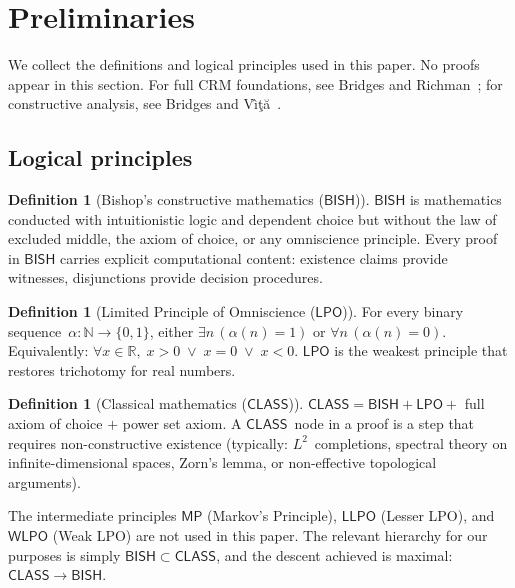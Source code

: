 \documentclass[11pt]{article}
\theoremstyle{plain}
\theoremstyle{definition}
\newtheorem{definition}[theorem]{Definition}
\theoremstyle{remark}
\newcommand{\N}{\mathbb{N}}
\newcommand{\R}{\mathbb{R}}
\newcommand{\BISH}{\mathsf{BISH}}
\newcommand{\LPO}{\mathsf{LPO}}
\newcommand{\WLPO}{\mathsf{WLPO}}
\newcommand{\LLPO}{\mathsf{LLPO}}
\newcommand{\MP}{\mathsf{MP}}
\newcommand{\CLASS}{\mathsf{CLASS}}
\begin{document}
\section{Preliminaries}
\label{sec:prelim}

We collect the definitions and logical principles used in this paper.
No proofs appear in this section.  For full CRM foundations,
see Bridges and Richman~\cite{bridges-richman}; for constructive analysis,
see Bridges and V\^{\i}\c{t}\u{a}~\cite{bridges-vita}.

\subsection{Logical principles}

\begin{definition}[Bishop's constructive mathematics ($\BISH$)]
\label{def:bish}
$\BISH$ is mathematics conducted with intuitionistic logic and dependent
choice but without the law of excluded middle, the axiom of choice, or any
omniscience principle.  Every proof in $\BISH$ carries explicit
computational content: existence claims provide witnesses, disjunctions
provide decision procedures.
\end{definition}

\begin{definition}[Limited Principle of Omniscience ($\LPO$)]
\label{def:lpo}
For every binary sequence~$\alpha : \N \to \{0,1\}$, either
$\exists n\, (\alpha(n) = 1)$ or $\forall n\, (\alpha(n) = 0)$.
Equivalently: $\forall x \in \R,\; x > 0 \;\lor\; x = 0 \;\lor\; x < 0$.
$\LPO$ is the weakest principle that restores trichotomy for real numbers.
\end{definition}

\begin{definition}[Classical mathematics ($\CLASS$)]
\label{def:class}
$\CLASS = \BISH + \LPO +$ full axiom of choice $+$ power set axiom.
A $\CLASS$~node in a proof is a step that requires non-constructive existence
(typically: $L^2$~completions, spectral theory on infinite-dimensional spaces,
Zorn's lemma, or non-effective topological arguments).
\end{definition}

The intermediate principles $\MP$ (Markov's Principle), $\LLPO$ (Lesser
LPO), and $\WLPO$ (Weak LPO) are not used in this paper.  The relevant
hierarchy for our purposes is simply $\BISH \subset \CLASS$, and the descent
achieved is maximal: $\CLASS \to \BISH$.
\end{document}
